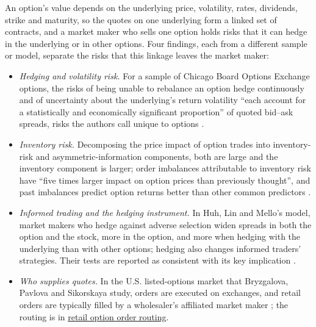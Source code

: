 \begin{qfresult}\label{res:option-market-maker-spreads}
 An option's value depends on the underlying price, volatility, rates, dividends, strike and maturity, so the quotes on one underlying form a linked set of contracts, and a market maker who sells one option holds risks that it can hedge in the underlying or in other options. Four findings, each from a different sample or model, separate the risks that this linkage leaves the market maker:
\begin{itemize}
\item \emph{Hedging and volatility risk.} For a sample of Chicago Board Options Exchange options, the risks of being unable to rebalance an option hedge continuously and of uncertainty about the underlying's return volatility ``each account for a statistically and economically significant proportion'' of quoted bid--ask spreads, risks the authors call unique to options \citep[abstract]{ex-jameson-wilhelm-1992}.
\item \emph{Inventory risk.} Decomposing the price impact of option trades into inventory-risk and asymmetric-information components, both are large and the inventory component is larger; order imbalances attributable to inventory risk have ``five times larger impact on option prices than previously thought'', and past imbalances predict option returns better than other common predictors \citep[abstract]{wide-muravyev-order-flow}.
\item \emph{Informed trading and the hedging instrument.} In Huh, Lin and Mello's model, market makers who hedge against adverse selection widen spreads in both the option and the stock, more in the option, and more when hedging with the underlying than with other options; hedging also changes informed traders' strategies. Their tests are reported as consistent with its key implication \citep[abstract]{ex-huh-lin-mello-2015}.
\item \emph{Who supplies quotes.} In the U.S. listed-options market that Bryzgalova, Pavlova and Sikorskaya study, orders are executed on exchanges, and retail orders are typically filled by a wholesaler's affiliated market maker \citep[published version, pp.~2 and~11]{ex-bryzgalova-pavlova-sikorskaya-2023}; the routing is in \hyperref[mech:options-retail-wholesaler-routing]{retail option order routing}.
\end{itemize}


\end{qfresult}
